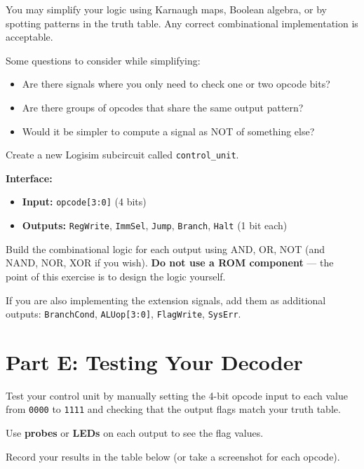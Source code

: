 \documentclass[11pt,a4paper]{article}
\newcommand{\opcode}[1]{\texttt{#1}}
\newcommand{\flag}[1]{\texttt{#1}}
\begin{document}
\begin{designnote}
You may simplify your logic using Karnaugh maps, Boolean algebra, or by spotting patterns in the truth table. Any correct combinational implementation is acceptable.

\medskip
\noindent Some questions to consider while simplifying:
\begin{itemize}[leftmargin=2em]
  \item Are there signals where you only need to check one or two opcode bits?
  \item Are there groups of opcodes that share the same output pattern?
  \item Would it be simpler to compute a signal as NOT of something else?
\end{itemize}
\end{designnote}

\begin{taskbox}
Create a new Logisim subcircuit called \texttt{control\_unit}.

\medskip
\noindent \textbf{Interface:}
\begin{itemize}[leftmargin=2em]
  \item \textbf{Input:} \texttt{opcode[3:0]} (4 bits)
  \item \textbf{Outputs:} \flag{RegWrite}, \flag{ImmSel}, \flag{Jump}, \flag{Branch}, \flag{Halt} (1 bit each)
\end{itemize}

\medskip
\noindent Build the combinational logic for each output using AND, OR, NOT (and NAND, NOR, XOR if you wish).
\textbf{Do not use a ROM component} --- the point of this exercise is to design the logic yourself.

\medskip
\noindent If you are also implementing the extension signals, add them as additional outputs:
\flag{BranchCond}, \flag{ALUop[3:0]}, \flag{FlagWrite}, \flag{SysErr}.
\end{taskbox}


\section{Part E: Testing Your Decoder}

\begin{taskbox}
Test your control unit by manually setting the 4-bit opcode input to each value from \opcode{0000} to \opcode{1111} and checking that the output flags match your truth table.

\medskip
\noindent Use \textbf{probes} or \textbf{LEDs} on each output to see the flag values.

\medskip
\noindent Record your results in the table below (or take a screenshot for each opcode).
\end{taskbox}
\end{document}
